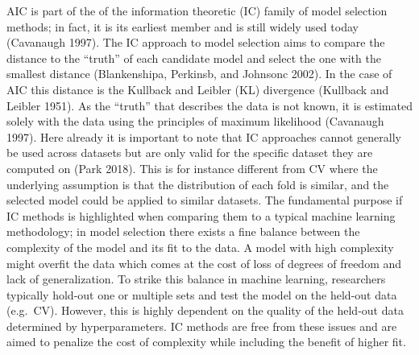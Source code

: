 \documentclass[12pt,]{article}
\begin{document}
AIC is part of the of the information theoretic (IC) family of model selection methods; in fact, it is its earliest member and is still widely used today (Cavanaugh 1997). The IC approach to model selection aims to compare the distance to the ``truth'' of each candidate model and select the one with the smallest distance (Blankenshipa, Perkinsb, and Johnsonc 2002). In the case of AIC this distance is the Kullback and Leibler (KL) divergence (Kullback and Leibler 1951). As the ``truth'' that describes the data is not known, it is estimated solely with the data using the principles of maximum likelihood (Cavanaugh 1997). Here already it is important to note that IC approaches cannot generally be used across datasets but are only valid for the specific dataset they are computed on (Park 2018). This is for instance different from CV where the underlying assumption is that the distribution of each fold is similar, and the selected model could be applied to similar datasets. The fundamental purpose if IC methods is highlighted when comparing them to a typical machine learning methodology; in model selection there exists a fine balance between the complexity of the model and its fit to the data. A model with high complexity might overfit the data which comes at the cost of loss of degrees of freedom and lack of generalization. To strike this balance in machine learning, researchers typically hold-out one or multiple sets and test the model on the held-out data (e.g.~CV). However, this is highly dependent on the quality of the held-out data determined by hyperparameters. IC methods are free from these issues and are aimed to penalize the cost of complexity while including the benefit of higher fit.
\end{document}
